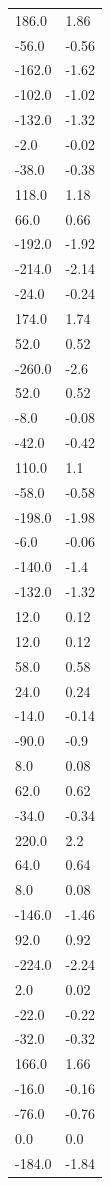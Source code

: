 \begin{longtable}{ll}
186.0 & 1.86 \\
-56.0 & -0.56 \\
-162.0 & -1.62 \\
-102.0 & -1.02 \\
-132.0 & -1.32 \\
-2.0 & -0.02 \\
-38.0 & -0.38 \\
118.0 & 1.18 \\
66.0 & 0.66 \\
-192.0 & -1.92 \\
-214.0 & -2.14 \\
-24.0 & -0.24 \\
174.0 & 1.74 \\
52.0 & 0.52 \\
-260.0 & -2.6 \\
52.0 & 0.52 \\
-8.0 & -0.08 \\
-42.0 & -0.42 \\
110.0 & 1.1 \\
-58.0 & -0.58 \\
-198.0 & -1.98 \\
-6.0 & -0.06 \\
-140.0 & -1.4 \\
-132.0 & -1.32 \\
12.0 & 0.12 \\
12.0 & 0.12 \\
58.0 & 0.58 \\
24.0 & 0.24 \\
-14.0 & -0.14 \\
-90.0 & -0.9 \\
8.0 & 0.08 \\
62.0 & 0.62 \\
-34.0 & -0.34 \\
220.0 & 2.2 \\
64.0 & 0.64 \\
8.0 & 0.08 \\
-146.0 & -1.46 \\
92.0 & 0.92 \\
-224.0 & -2.24 \\
2.0 & 0.02 \\
-22.0 & -0.22 \\
-32.0 & -0.32 \\
166.0 & 1.66 \\
-16.0 & -0.16 \\
-76.0 & -0.76 \\
0.0 & 0.0 \\
-184.0 & -1.84 \\

\end{longtable}
